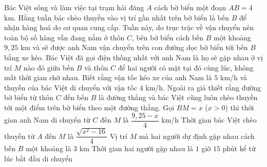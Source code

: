 \begin{ex}%
	Bác Việt sống và làm việc tại trạm hải đăng $A$ cách bờ biển một đoạn $AB=4$ km. Hằng tuần bác chèo thuyền vào vị trí gần nhất trên bờ biển là bến $B$ để nhận hàng hoá do cơ quan cung cấp. Tuần này, do trục trặc về vận chuyển nên toàn bộ số hàng vẫn đang nằm ở thôn $C$, bên bờ biển cách bến $B$ một khoảng $9{,}25$ km và sẽ được anh Nam vận chuyển trên con đường dọc bờ biển tới bến $B$ bằng xe kéo. Bác Việt đã gọi điện thống nhất với anh Nam là họ sẽ gặp nhau ở vị trí $M$ nào đó giữa bến $B$ và thôn $C$ để hai người có mặt tại đó cùng lúc, không mất thời gian chờ nhau. Biết rằng vận tốc kéo xe của anh Nam là $5$ km/h và thuyền của bác Việt di chuyển với vận tốc $4$ km/h. Ngoài ra giả thiết rằng đường bờ biển từ thôn $C$ đến bến $B$ là đường thẳng và bác Việt cũng luôn chèo thuyền tới một điểm trên bờ biển theo một đường thẳng.
	\choiceTF
	{Gọi $BM=x$ ($x>0$) thì thời gian anh Nam di chuyển từ $C$ đến $M$ là $\dfrac{9{,}25-x}{4}$ km/h}
	{Thời gian bác Việt chèo thuyền từ $A$ đến $M$ là $\dfrac{\sqrt{x^{2}-16}}{4}$}
	{\True Vị trí $M$ mà hai người dự định gặp nhau cách bến $B$ một khoảng là $3$ km}
	{\True Thời gian hai người gặp nhau là $1$ giờ $15$ phút kể từ lúc bắt đầu di chuyển}
\end{ex}
